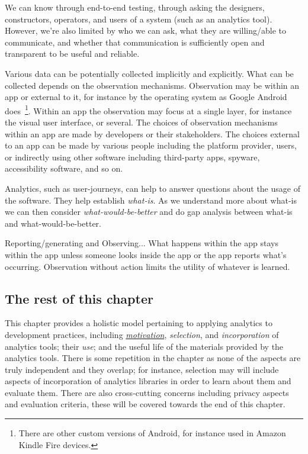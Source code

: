We can know through end-to-end testing, through asking the designers, constructors, operators, and users of a system (such as an analytics tool). However, we're also limited by who we can ask, what they are willing/able to communicate, and whether that communication is sufficiently open and transparent to be useful and reliable.


Various data can be potentially collected implicitly and explicitly. What can be collected depends on the observation mechanisms. Observation may be within an app or external to it, for instance by the operating system as Google Android does~\footnote{There are other custom versions of Android, for instance used in Amazon Kindle Fire devices.}. Within an app the observation may focus at a single layer, for instance the visual user interface, or several. The choices of observation mechanisms within an app are made by developers or their stakeholders. The choices external to an app can be made by various people including the platform provider, users, or indirectly using other software including third-party apps, spyware, accessibility software, and so on.



Analytics, such as user-journeys, can help to answer questions about the usage of the software. They help establish \emph{what-is}. As we understand more about what-is we can then consider \emph{what-would-be-better} and do gap analysis between what-is and what-would-be-better.

Reporting/generating and Observing... What happens within the app stays within the app unless someone looks inside the app or the app reports what's occurring. Observation without action limits the utility of whatever is learned. 


\subsection{The rest of this chapter}
This chapter provides a holistic model pertaining to applying analytics to development practices, including \href{motivation-section}{\textit{motivation}}, \textit{selection}, and \textit{incorporation} of analytics tools; their \textit{use}; and the useful life of the materials provided by the analytics tools. There is some repetition in the chapter as none of the aspects are truly independent and they overlap; for instance, selection may will include aspects of incorporation of analytics libraries in order to learn about them and evaluate them. There are also cross-cutting concerns including privacy aspects and evaluation criteria, these will be covered towards the end of this chapter.

